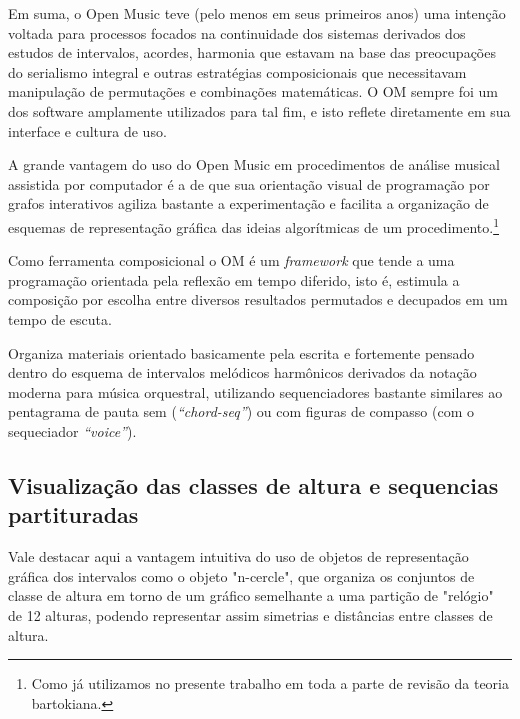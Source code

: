 \documentclass[
	12pt,				%
	openright,			%
	twoside,			%
	a4paper,			%
	english,			%
	french,				%
	spanish,			%
	brazil				%
	]{abntex2}
\begin{document}
Em suma, o Open Music teve (pelo menos em seus primeiros anos) uma intenção voltada para processos focados na continuidade dos sistemas derivados dos estudos de intervalos, acordes, harmonia que estavam na base das preocupações do serialismo integral e outras estratégias composicionais que necessitavam manipulação de permutações e combinações matemáticas. O OM sempre foi um dos software amplamente utilizados para tal fim, e isto reflete diretamente em sua interface e cultura de uso.

A grande vantagem do uso do Open Music em procedimentos de análise musical assistida por computador é a de que sua orientação visual de programação por grafos interativos agiliza bastante a experimentação e facilita a organização de esquemas de representação gráfica das ideias algorítmicas de um procedimento.\footnote{Como já utilizamos no presente trabalho em toda a parte de revisão da teoria bartokiana.} 

Como ferramenta composicional o OM é um \textit{framework} que tende a uma programação orientada pela reflexão em tempo diferido, isto é, estimula a composição por escolha entre diversos resultados permutados e decupados em um tempo de escuta.

Organiza materiais orientado basicamente pela escrita e fortemente pensado dentro do esquema de intervalos melódicos
harmônicos derivados da notação moderna para música orquestral, utilizando sequenciadores bastante similares ao pentagrama de pauta sem (\textit{“chord-seq”}) ou com figuras de compasso (com o sequeciador \textit{“voice”}).



\subsection{Visualização das classes de altura e sequencias partituradas}

Vale destacar aqui a vantagem intuitiva do uso de objetos de representação gráfica dos intervalos como o objeto "n-cercle", que organiza os conjuntos de classe de altura em torno de um gráfico semelhante a uma partição de "relógio" de 12 alturas, podendo representar assim simetrias e distâncias entre classes de altura.
\end{document}
